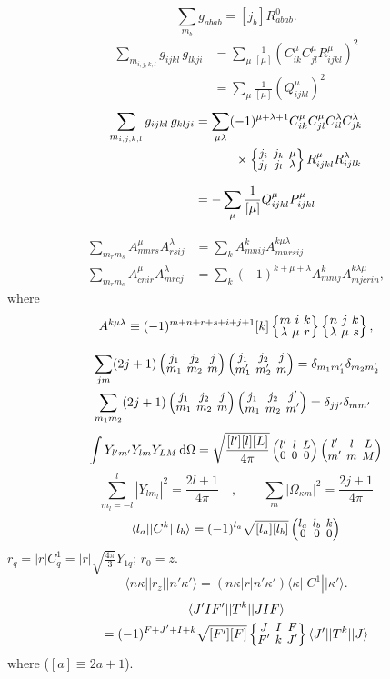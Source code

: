 \documentclass[10pt,twocolumn,a4paper]{article}%
\newcommand{\bra}[1]{\ensuremath{\langle #1|}}	%
\newcommand{\ket}[1]{\ensuremath{|#1\rangle}}
\newcommand{\threej}[6]{
\renewcommand\arraystretch{0.75}\setlength\arraycolsep{2pt}
\small\ensuremath{\begin{pmatrix}#1&#2&#3\\#4&#5&#6\end{pmatrix}}
}	%
\newcommand{\sixj}[6]{\renewcommand\arraystretch{0.75}\setlength\arraycolsep{2pt}\small\ensuremath{\begin{Bmatrix}#1&#2&#3\\#4&#5&#6\end{Bmatrix}}}	%
\newcommand{\sixjs}[6]{\renewcommand\arraystretch{0.75}\ensuremath{\begin{Bmatrix}#1~#2~#3\\#4~#5~#6\end{Bmatrix}}}	%
\newcommand{\be}{\begin{equation}}
\newcommand{\ee}{\end{equation}}
\def\d{\ensuremath{{\rm d}}}
\renewcommand{\k}{\ensuremath{\kappa}}
\begin{document}
\be
\sum_{m_b}g_{abab} = [j_b] R^0_{abab}.
\ee
%
\begin{align}
\sum_{m_{i,j,k,l}}  g_{ijkl} \, g_{lkji}
    &= \sum_\mu \frac{1}{[\mu]} \left( C^\mu_{ik}C^\mu_{jl} R^\mu_{ijkl}\right)^2 \\
    &= \sum_\mu \frac{1}{[\mu]} \left( Q^\mu_{ijkl}\right)^2 
\end{align}
\begin{align}
\sum_{m_{i,j,k,l}}  g_{ijkl} \, g_{klji}
    &=\sum_{\mu \lambda}(-1)^{\mu+\lambda+1}C^\mu_{ik}C^\mu_{jl}C^\lambda_{il}C^\lambda_{jk} \notag \\
    &\phantom{=\sum_{\mu \lambda}}~~\times \sixj{j_i}{j_k}{\mu}{j_j}{j_l}{\lambda}R^\mu_{ijkl}R^\lambda_{ijlk} \\
    &=-\sum_\mu \frac{1}{[\mu]}  Q^\mu_{ijkl}P^\mu_{ijkl}
\end{align}

\begin{align}
\sum_{m_r m_s}A^\mu_{mnrs} A^\lambda_{rsij} &= \sum_k A^k_{mnij}A^{k\mu\lambda}_{mnrsij}\\
\sum_{m_r m_c}A^\mu_{cnir} A^\lambda_{mrcj} &= \sum_k (-1)^{k+\mu+\lambda}A^k_{mnij}A^{k\lambda\mu}_{mjcrin},
\end{align}
where
\be
A^{k\mu\lambda} \equiv (-1)^{m+n+r+s+i+j+1}[k]\sixjs{m}{i}{k}{\lambda}{\mu}{r}\sixjs{n}{j}{k}{\lambda}{\mu}{s},
\ee




\begin{align}\notag
&\sum_{jm}(2j+1)\threej{j_1}{j_2}{j}{m_1}{m_2}{m}\threej{j_1}{j_2}{j}{m_1'}{m_2'}{m} = \delta_{m_1m_1'}\delta_{m_2m_2'}
\\
&\sum_{m_1m_2}(2j+1)\threej{j_1}{j_2}{j}{m_1}{m_2}{m}\threej{j_1}{j_2}{j'}{m_1}{m_2}{m'} = \delta_{jj'}\delta_{mm'}
\end{align}
%
\begin{multline}
\int Y_{l'm'}Y_{lm}Y_{LM}\,\d \Omega = \sqrt{\frac{[l'][l][L]}{4\pi}}\threej{l'}{l}{L}{0}{0}{0}\threej{l'}{l}{L}{m'}{m}{M}
\end{multline}
\be
\sum_{m_l=-l}^l |Y_{lm_l}|^2 = \frac{2l+1}{4\pi}\quad,\qquad \sum_m |\Omega_{\k m}|^2 = \frac{2j+1}{4\pi}
\ee
%
\be
\bra{l_a}|C^k|\ket{l_b} = (-1)^{l_a}\sqrt{[l_a][l_b]}\threej{l_a}{l_b}{k}{0}{0}{0}
\ee
%
$r_q = |r| C^1_q = |r|\sqrt{\frac{4\pi}{3}}Y_{1q}$; $r_0=z$.
\be
\bra{n\k}|r_z|\ket{n'\k'} = ({n\k}|r|{n'\k'})\bra{\k}|C^1|\ket{\k'}.
\ee
%
\begin{multline}
\bra{J'IF'}|T^k|\ket{JIF} \\= (-1)^{F+J'+I+k}\sqrt{[F'][F]}\sixj{J}{I}{F}{F'}{k}{J'}\bra{J'}|T^k|\ket{J}
\end{multline}
where ($[a]\equiv2a+1$).
\end{document}
